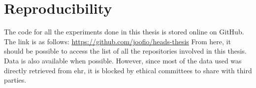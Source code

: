 \chapter*{Reproducibility}


The code for all the experiments done in this thesis is stored online on GitHub.
The link is as follows: \url{https://github.com/joofio/heads-thesis}
From here, it should be possible to access the list of all the repositories involved in this thesis.
Data is also available when possible. However, since most of the data used was directly retrieved from \acl{ehr}, it is blocked by ethical committees to share with third parties.
